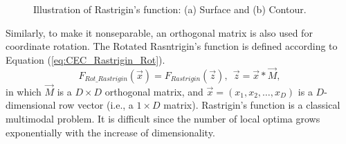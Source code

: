 \begin{itemize}
\begin{figure}[!h]
      \caption{Illustration of Rastrigin's function: (a) Surface and (b) Contour.}
      \label{fig:CEC_Rastrigin}
      \end{figure}
      Similarly, to make it nonseparable, an orthogonal matrix is also used for coordinate rotation. The Rotated Rasntrigin's function is defined according to Equation (\ref{eq:CEC_Rastrigin_Rot}).
      \begin{equation}\label{eq:CEC_Rastrigin_Rot}
      F_{Rot\_Rastrigin}(\vec{x}) = F_{Rastrigin}(\vec{z}), \ \ \vec{z} = \vec{x} \ast \vec{M},
      \end{equation}
      in which $\vec{M}$ is a $D \times D$ orthogonal matrix, and $\vec{x} = (x_1, x_2, \ldots, x_D)$ is a $D$-dimensional row vector (i.e., a $1 \times D$ matrix). Rastrigin's function is a classical multimodal problem. It is difficult since the number of local optima grows exponentially with the increase of dimensionality.


\end{itemize}
